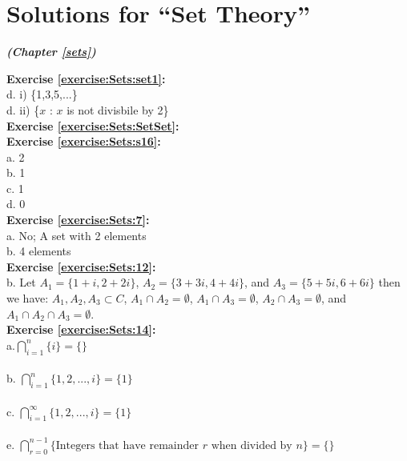 
\section{Solutions for ``Set Theory''}
\noindent\textbf{\textit{ (Chapter \ref{sets})}}\bigskip

\noindent\textbf{Exercise \ref{exercise:Sets:set1}:}\\
d. i) \{1,3,5,...\}\\
d. ii) \{$x$ : $x$ is not divisbile by 2\}\\

\noindent\textbf{Exercise \ref{exercise:Sets:SetSet}:}\\

\noindent\textbf{Exercise \ref{exercise:Sets:s16}:}\\
a. 2\\
b. 1\\
c. 1\\
d. 0\\

\noindent\textbf{Exercise \ref{exercise:Sets:7}:}\\
a. No; A set with 2 elements\\
b. 4 elements\\


\noindent\textbf{Exercise \ref{exercise:Sets:12}:}\\
b. Let $A_1=\{ 1+i,2+2i\}$, $A_2=\{ 3+3i,4+4i\}$, and $A_3=\{5+5i,6+6i\}$ then we have:
$A_1,A_2,A_3 \subset C$, $A_1 \cap A_2=\emptyset$, $A_1 \cap A_3=\emptyset$, $A_2 \cap A_3=\emptyset$, and $A_1 \cap A_2 \cap A_3=\emptyset$.\\

\noindent\textbf{Exercise \ref{exercise:Sets:14}:}\\
a.$\bigcap_{i = 1}^{n}  \{i\}=\{\}$\\
\\
b. $\bigcap^{n}_{i=1} \{ 1,2,...,i \}=\{1\}$\\
\\
c. $\bigcap^{\infty}_{i=1} \{ 1,2,...,i \}=\{1\}$\\
\\
e. $\bigcap_{r = 0}^{n-1}  \{\mbox{Integers that have remainder }r \mbox{ when divided by }n\}=\{\}$\\

